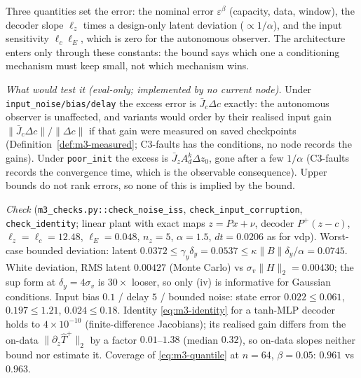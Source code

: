 \begin{remark}\label{rem:m3-knobs}
Three quantities set the error: the nominal error $\varepsilon^\beta$ (capacity, data, window),
the decoder slope $\ell_z$ times a design-only latent deviation ($\propto1/\alpha$), and the input
sensitivity $\ell_c\ell_E$, which is zero for the autonomous observer. The architecture enters only
through these constants: the bound says which one a conditioning mechanism must keep small, not
which mechanism wins.
\end{remark}

\emph{What would test it (eval-only; implemented by no current node).} Under \texttt{input\_noise/bias/delay} the
excess error is $\bar J_c\Delta c$ exactly: the autonomous observer is unaffected, and variants would order by their
realised input gain $\|\bar J_c\Delta c\|/\|\Delta c\|$ if that gain were measured on saved checkpoints
(Definition~\ref{def:m3-measured}; C3-faults has the conditions, no node records the gains). Under \texttt{poor\_init}
the excess is $\bar J_zA_d^k\Delta z_0$, gone after a few $1/\alpha$ (C3-faults records the convergence time, which is
the observable consequence). Upper bounds do not rank errors, so none of this is implied by the bound.

\emph{Check} (\texttt{m3\_checks.py::check\_noise\_iss}, \texttt{check\_input\_corruption},
\texttt{check\_identity}; linear plant with exact maps $z=Px+\nu$, decoder $P^{+}(z-c)$,
$\ell_z=\ell_c=12.48$, $\ell_E=0.048$, $n_z=5$, $\alpha=1.5$, $dt=0.0206$ as for vdp).
Worst-case bounded deviation: latent $0.0372\le\gamma_y\delta_y=0.0537\le\kappa\|B\|\delta_y/\alpha=0.0745$.
White deviation, RMS latent $0.00427$ (Monte Carlo) vs $\sigma_v\|H\|_2=0.00430$; the sup form at
$\delta_y=4\sigma_v$ is $30\times$ looser, so only (iv) is informative for Gaussian conditions. Input
bias $0.1$ / delay $5$ / bounded noise: state error $0.022\le0.061$, $0.197\le1.21$, $0.024\le0.18$.
Identity \eqref{eq:m3-identity} for a tanh-MLP decoder holds to $4\times10^{-10}$ (finite-difference Jacobians); its realised gain differs from the on-data
$\|\partial_z\hat T^{+}\|_2$ by a factor $0.01$--$1.38$ (median $0.32$), so on-data slopes neither
bound nor estimate it. Coverage of \eqref{eq:m3-quantile} at $n=64$, $\beta=0.05$: $0.961$ vs $0.963$.

